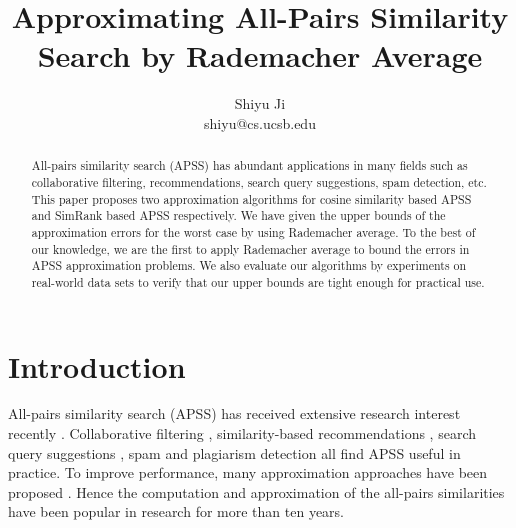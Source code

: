 \documentclass{article}
\begin{document}
\title{\Large\bf Approximating All-Pairs Similarity Search by Rademacher Average}
\author{Shiyu Ji\\ shiyu@cs.ucsb.edu}
\date{}
\maketitle

\newtheorem{definition}{Definition}
\theoremstyle{definition}
\newtheorem{theorem}{Theorem}
\theoremstyle{plain}
\newtheorem{lemma}{Lemma}
\theoremstyle{plain}
\newtheorem{corollary}{Corollary}
\theoremstyle{plain}

\begin{abstract}
All-pairs similarity search (APSS) has abundant applications in many fields such as collaborative filtering, recommendations, search query suggestions, spam detection, etc.
This paper proposes two approximation algorithms for cosine similarity based APSS and SimRank based APSS respectively. 
We have given the upper bounds of the approximation errors for the worst case by using Rademacher average.
To the best of our knowledge, we are the first to apply Rademacher average to bound the errors in APSS approximation problems.
We also evaluate our algorithms by experiments on real-world data sets to verify that our upper bounds are tight enough for practical use.
\end{abstract}

\section{Introduction}
All-pairs similarity search (APSS) has received extensive research interest recently \cite{BMS07,Xia16,ATY13,TAJY14}. Collaborative filtering \cite{SKK01}, similarity-based recommendations \cite{RV97}, search query suggestions \cite{CJP08}, spam and plagiarism detection \cite{CDG07,LCH06} all find APSS useful in practice. To improve performance, many approximation approaches have been proposed \cite{GIM99,FKS03,IM98,Char02}. Hence the computation \cite{BMS07,DHM04,Xia16,ATY13,TAJY14} and approximation \cite{GIM99,FKS03,IM98,Char02} of the all-pairs similarities have been popular in research for more than ten years. 
\end{document}

